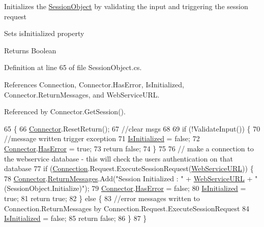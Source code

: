 Initializes the \mbox{\hyperlink{class_session_object}{Session\+Object}} by validating the input and triggering the session request 

Sets is\+Initialized property

\begin{DoxyReturn}{Returns}
Boolean
\end{DoxyReturn}


Definition at line 65 of file Session\+Object.\+cs.



References Connection, Connector.\+Has\+Error, Is\+Initialized, Connector.\+Return\+Messages, and Web\+Service\+U\+RL.



Referenced by Connector.\+Get\+Session().


\begin{DoxyCode}
65                              \{
66         \mbox{\hyperlink{class_connector}{Connector}}.ResetReturn();
67         \textcolor{comment}{//clear msgs}
68 
69         \textcolor{keywordflow}{if} (!ValidateInput()) \{
70             \textcolor{comment}{//message written trigger exception}
71             \mbox{\hyperlink{class_session_object_ae0885b9054fc3ce287307ac16ff69990}{IsInitialized}} = \textcolor{keyword}{false};
72             \mbox{\hyperlink{class_connector}{Connector}}.\mbox{\hyperlink{class_connector_a9365777a6b7b711b75bcfa6c4d53e989}{HasError}} = \textcolor{keyword}{true};
73             \textcolor{keywordflow}{return} \textcolor{keyword}{false};
74         \}
75 
76         \textcolor{comment}{// make a connection to the webservice database - this will check the users authentication on that
       database}
77         \textcolor{keywordflow}{if} (\mbox{\hyperlink{class_session_object_a014bdbf705a753540e19bfb53030c55c}{Connection}}.Request.ExecuteSessionRequest(\mbox{\hyperlink{class_session_object_a697c071c812fbf7ad1166b896fb44c16}{WebServiceURL}})) \{
78             \mbox{\hyperlink{class_connector}{Connector}}.\mbox{\hyperlink{class_connector_a1ed422674b344524fd77998dcf6a9ba6}{ReturnMessages}}.Add(\textcolor{stringliteral}{"Session Initialized : "} + 
      \mbox{\hyperlink{class_session_object_a697c071c812fbf7ad1166b896fb44c16}{WebServiceURL}} + \textcolor{stringliteral}{" (SessionObject.Initialize)"});
79             \mbox{\hyperlink{class_connector}{Connector}}.\mbox{\hyperlink{class_connector_a9365777a6b7b711b75bcfa6c4d53e989}{HasError}} = \textcolor{keyword}{false};
80             \mbox{\hyperlink{class_session_object_ae0885b9054fc3ce287307ac16ff69990}{IsInitialized}} = \textcolor{keyword}{true};
81             \textcolor{keywordflow}{return} \textcolor{keyword}{true};
82         \} \textcolor{keywordflow}{else} \{
83             \textcolor{comment}{//error messages written to Connection.ReturnMessages by
       Connection.Request.ExecuteSessionRequest}
84             \mbox{\hyperlink{class_session_object_ae0885b9054fc3ce287307ac16ff69990}{IsInitialized}} = \textcolor{keyword}{false};
85             \textcolor{keywordflow}{return} \textcolor{keyword}{false};
86         \}
87     \}
\end{DoxyCode}


